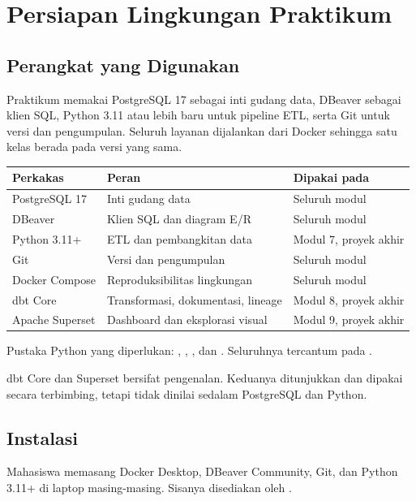 \chapter{Persiapan Lingkungan Praktikum}

\section{Perangkat yang Digunakan}

Praktikum memakai PostgreSQL 17 sebagai inti gudang data, DBeaver sebagai klien
SQL, Python 3.11 atau lebih baru untuk pipeline ETL, serta Git untuk versi dan
pengumpulan. Seluruh layanan dijalankan dari Docker sehingga satu kelas berada
pada versi yang sama.

\begin{center}
\small
\begin{tabular}{@{}p{}p{}p{}@{}}
\toprule
\textbf{Perkakas} & \textbf{Peran} & \textbf{Dipakai pada} \\
\midrule
PostgreSQL 17 & Inti gudang data & Seluruh modul \\
DBeaver & Klien SQL dan diagram E/R & Seluruh modul \\
Python 3.11+ & ETL dan pembangkitan data & Modul 7, proyek akhir \\
Git & Versi dan pengumpulan & Seluruh modul \\
Docker Compose & Reproduksibilitas lingkungan & Seluruh modul \\
dbt Core & Transformasi, dokumentasi, lineage & Modul 8, proyek akhir \\
Apache Superset & Dashboard dan eksplorasi visual & Modul 9, proyek akhir \\
\bottomrule
\end{tabular}
\end{center}

Pustaka Python yang diperlukan: , ,
, dan . Seluruhnya tercantum pada
.

dbt Core dan Superset bersifat pengenalan. Keduanya ditunjukkan dan dipakai
secara terbimbing, tetapi tidak dinilai sedalam PostgreSQL dan Python.

\section{Instalasi}

Mahasiswa memasang Docker Desktop, DBeaver Community, Git, dan Python 3.11+ di
laptop masing-masing. Sisanya disediakan oleh .

